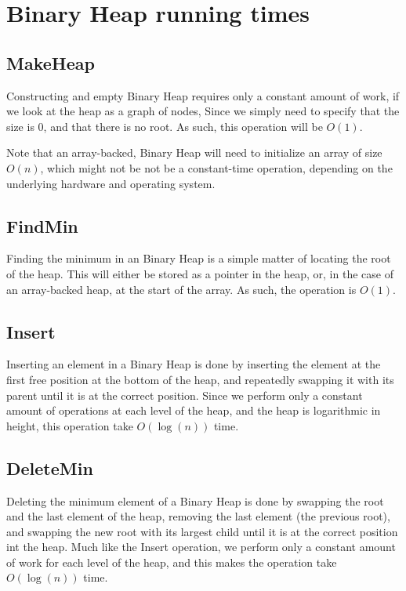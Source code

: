 \section{Binary Heap running times}

\subsection{MakeHeap}

Constructing and empty Binary Heap requires only a constant amount of work, if we look at the heap as a graph of nodes, Since we simply need to specify that the size is 0, and that there is no root. As such, this operation will be $O(1)$.

Note that an array-backed, Binary Heap will need to initialize an array of size $O(n)$, which might not be not be a constant-time operation, depending on the underlying hardware and operating system.

\subsection{FindMin}

Finding the minimum in an Binary Heap is a simple matter of locating the root of the heap. This will either be stored as a pointer in the heap, or, in the case of an array-backed heap, at the start of the array. As such, the operation is $O(1)$.

\subsection{Insert}

Inserting an element in a Binary Heap is done by inserting the element at the first free position at the bottom of the heap, and repeatedly swapping it with its parent until it is at the correct position. Since we perform only a constant amount of operations at each level of the heap, and the heap is logarithmic in height, this operation take $O(\log (n))$ time.

\subsection{DeleteMin}

Deleting the minimum element of a Binary Heap is done by swapping the root and the last element of the heap, removing the last element (the previous root), and swapping the new root with its largest child until it is at the correct position int the heap. Much like the Insert operation, we perform only a constant amount of work for each level of the heap, and this makes the operation take $O(\log (n))$ time.

